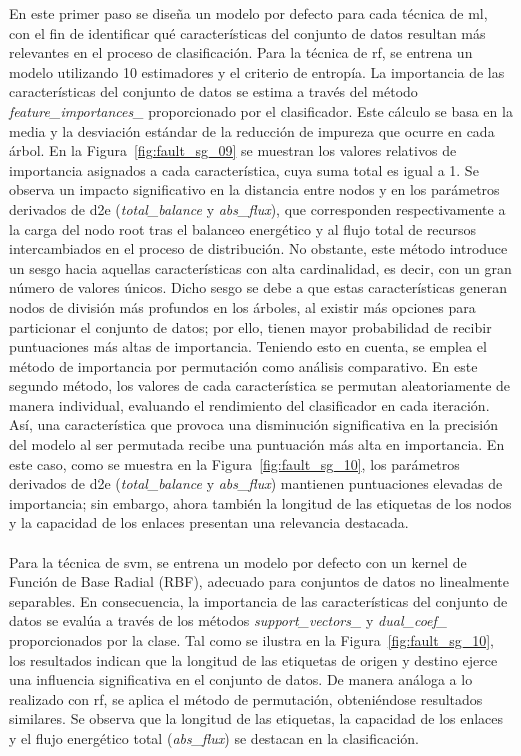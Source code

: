 En este primer paso se diseña un modelo por defecto para cada técnica de \gls{ml}, con el fin de identificar qué características del conjunto de datos resultan más relevantes en el proceso de clasificación. Para la técnica de \gls{rf}, se entrena un modelo utilizando 10 estimadores y el criterio de entropía. La importancia de las características del conjunto de datos se estima a través del método \textit{feature\_importances\_} proporcionado por el clasificador. Este cálculo se basa en la media y la desviación estándar de la reducción de impureza que ocurre en cada árbol. En la Figura~\ref{fig:fault_sg_09} se muestran los valores relativos de importancia asignados a cada característica, cuya suma total es igual a 1. Se observa un impacto significativo en la distancia entre nodos y en los parámetros derivados de \gls{d2e} (\textit{total\_balance} y \textit{abs\_flux}), que corresponden respectivamente a la carga del nodo root tras el balanceo energético y al flujo total de recursos intercambiados en el proceso de distribución. No obstante, este método introduce un sesgo hacia aquellas características con alta cardinalidad, es decir, con un gran número de valores únicos. Dicho sesgo se debe a que estas características generan nodos de división más profundos en los árboles, al existir más opciones para particionar el conjunto de datos; por ello, tienen mayor probabilidad de recibir puntuaciones más altas de importancia. Teniendo esto en cuenta, se emplea el método de importancia por permutación como análisis comparativo. En este segundo método, los valores de cada característica se permutan aleatoriamente de manera individual, evaluando el rendimiento del clasificador en cada iteración. Así, una característica que provoca una disminución significativa en la precisión del modelo al ser permutada recibe una puntuación más alta en importancia. En este caso, como se muestra en la Figura~\ref{fig:fault_sg_10}, los parámetros derivados de \gls{d2e} (\textit{total\_balance} y \textit{abs\_flux}) mantienen puntuaciones elevadas de importancia; sin embargo, ahora también la longitud de las etiquetas de los nodos y la capacidad de los enlaces presentan una relevancia destacada.\\
\\
Para la técnica de \gls{svm}, se entrena un modelo por defecto con un kernel de Función de Base Radial (RBF), adecuado para conjuntos de datos no linealmente separables. En consecuencia, la importancia de las características del conjunto de datos se evalúa a través de los métodos \textit{support\_vectors\_} y \textit{dual\_coef\_} proporcionados por la clase. Tal como se ilustra en la Figura~\ref{fig:fault_sg_10}, los resultados indican que la longitud de las etiquetas de origen y destino ejerce una influencia significativa en el conjunto de datos. De manera análoga a lo realizado con \gls{rf}, se aplica el método de permutación, obteniéndose resultados similares. Se observa que la longitud de las etiquetas, la capacidad de los enlaces y el flujo energético total (\textit{abs\_flux}) se destacan en la clasificación.


